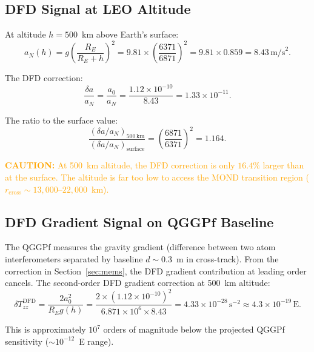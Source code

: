\documentclass[11pt]{article}
\theoremstyle{definition}
\theoremstyle{remark}
\newcommand{\ee}[1]{\times10^{#1}}
\newcommand{\azero}{a_0}
\newcommand{\caution}[1]{\textcolor{orange}{\textbf{CAUTION:} #1}}
\begin{document}
\subsection{DFD Signal at LEO Altitude}

At altitude $h = 500$~km above Earth's surface:
\begin{equation}
a_N(h) = g \left(\frac{R_E}{R_E + h}\right)^2
= 9.81 \times \left(\frac{6371}{6871}\right)^2
= 9.81 \times 0.859 = 8.43\,\mathrm{m/s}^2.
\end{equation}

The DFD correction:
\begin{equation}
\frac{\delta a}{a_N} = \frac{\azero}{a_N} = \frac{1.12\ee{-10}}{8.43}
= 1.33\ee{-11}.
\end{equation}

The ratio to the surface value:
\begin{equation}
\frac{(\delta a/a_N)_{500\,\mathrm{km}}}{(\delta a/a_N)_{\mathrm{surface}}}
= \left(\frac{6871}{6371}\right)^2 = 1.164.
\end{equation}

\caution{At 500~km altitude, the DFD correction is only $16.4\%$ larger
than at the surface. The altitude is far too low to access the MOND
transition region ($r_{\mathrm{cross}} \sim 13{,}000$--$22{,}000$~km).}

\subsection{DFD Gradient Signal on QGGPf Baseline}

The QGGPf measures the gravity gradient (difference between two atom
interferometers separated by baseline $d \sim 0.3$~m in cross-track).
From the correction in Section~\ref{sec:mems}, the DFD gradient
contribution at leading order cancels. The second-order DFD gradient
correction at 500~km altitude:
\begin{equation}
\delta T_{zz}^{\mathrm{DFD}} = \frac{2\azero^2}{R_E g(h)}
= \frac{2 \times (1.12\ee{-10})^2}{6.871\ee{6} \times 8.43}
= 4.33\ee{-28}\,\mathrm{s}^{-2}
\approx 4.3\ee{-19}\,\mathrm{E}.
\end{equation}

This is approximately $10^{7}$ orders of magnitude below the
projected QGGPf sensitivity ($\sim 10^{-12}$~E range).
\end{document}
